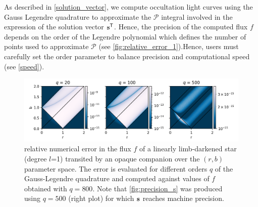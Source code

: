 \documentclass[modern]{aastex631}
\begin{document}
As described in \autoref{solution_vector}, we compute occultation light curves using the Gauss Legendre quadrature to approximate the $\mathcal{P}$ integral involved in the expression of the solution vector ${\mathbf{s}}^\mathsf{T}$. Hence, the precision of the computed flux $f$ depends on the order of the Legendre polynomial which defines the number of points used to approximate $\mathcal{P}$ (see \autoref{fig:relative_error_1}).Hence, users must carefully set the order parameter to balance precision and computational speed (see \autoref{speed}).
\begin{figure}[H]
    \begin{center}
        \includegraphics[width=\textwidth]{../workflows/precision/figures/br_error.png}
        \caption{relative numerical error in the flux $f$ of a linearly limb-darkened star (degree $l$=1) transited by an opaque companion over the $(r, b)$ parameter space. The error is evaluated for different orders $q$ of the Gauss-Legendre quadrature and computed against values of $f$ obtained with $q=800$. Note that \autoref{fig:precision_s} was produced using $q=500$ (right plot) for which ${\mathbf{s}}$ reaches machine precision. }
        \label{fig:relative_error_1}
    \end{center}
\end{figure}
\end{document}

